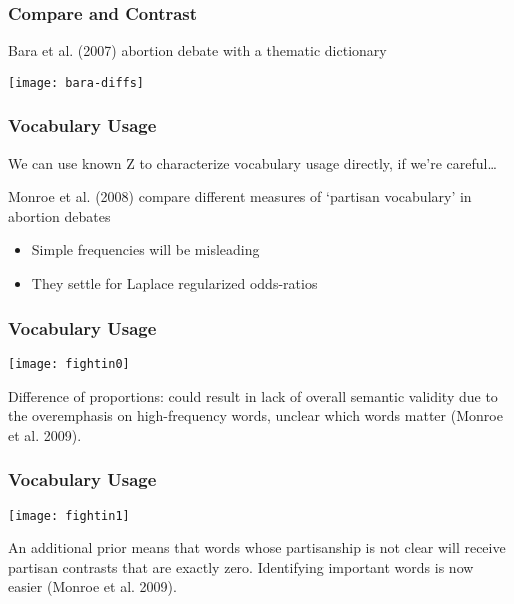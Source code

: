 \documentclass[11pt,compress,professionalfonts]{beamer}
\newcommand{\ita}{\begin{itemize}}
\newcommand{\itm}{\item[]}
\newcommand{\itz}{\end{itemize}}
\begin{document}
\begin{frame}[t,fragile]\frametitle{Compare and Contrast}

Bara et al. (2007) abortion debate with a thematic dictionary
\begin{center}
\texttt{[image: bara-diffs]}
\end{center}

\end{frame}
\begin{frame}[t,fragile]\frametitle{Vocabulary Usage}

We can use known Z to characterize vocabulary usage directly, if we're careful\ldots

Monroe et al. (2008) compare different measures of `partisan vocabulary' in abortion debates
\ita
\itm Simple frequencies will be misleading
\itm They settle for Laplace regularized odds-ratios
\itz


\end{frame}
\begin{frame}[t,fragile]\frametitle{Vocabulary Usage}

\centerline{\texttt{[image: fightin0]}}

{\footnotesize Difference of proportions: could result in lack of overall semantic validity due to the overemphasis on high-frequency words, unclear which words matter (Monroe et al. 2009).}

\end{frame}
\begin{frame}[t,fragile]\frametitle{Vocabulary Usage}

\centerline{\texttt{[image: fightin1]}}

{\footnotesize An additional prior means that words whose partisanship is not clear will receive partisan contrasts that are exactly zero. Identifying important words is now easier (Monroe et al. 2009).}

\end{frame}
\end{document}
